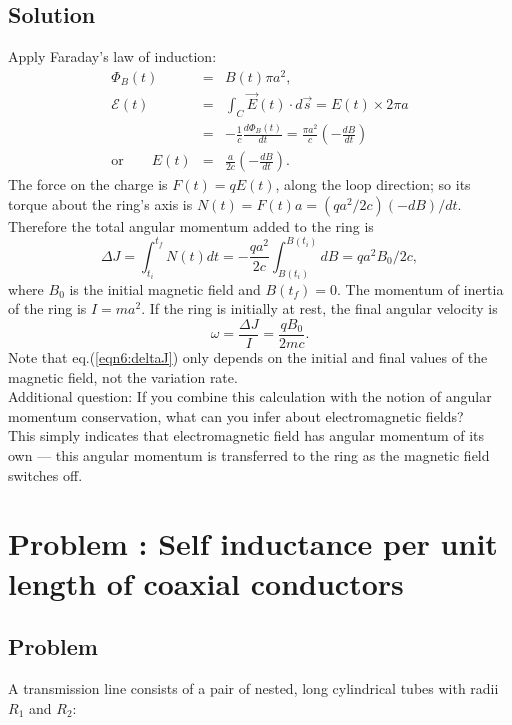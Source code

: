 \documentclass[solutions]{esg8022pset}
\begin{document}
\subsection{Solution}
Apply  Faraday's law of induction:
\begin{eqnarray}
\Phi_B(t)&=&B(t)\pi a^2,\nonumber\\
{\mathcal{E}}(t)&=&\int_C \vec{E}(t)\cdot d\vec{s}=E(t)\times 2\pi a\nonumber\\
&=& -\frac{1}{c}\frac{d\Phi_B(t)}{dt}=\frac{\pi
a^2}{c}\left(-\frac{dB}{dt}\right)\\
\textrm{or}\qquad E(t)&=& \frac{a}{2c}\left(-\frac{dB}{dt}\right).
\end{eqnarray}
The force on the charge is $F(t)=qE(t)$, along the loop
direction; so its torque about the ring's axis is $N(t)=F(t)a=
(qa^2/2c)(-dB)/dt$.  Therefore the total angular momentum added to the ring is
\begin{equation}\label{eqn6:deltaJ}
\Delta J=\int_{t_{i}}^{t_{f}} N(t)dt=-\frac{qa^2}{2c}\int_{B(t_{i})}^{B(t_{i})}dB=qa^2 B_0/2c,
\end{equation}
where $B_0$ is the initial magnetic field and $B(t_{f})=0$.  The
momentum of inertia of the ring is  $I=ma^2$.  If the ring is
initially at rest, the final angular velocity is
\begin{equation}
\omega=\frac{\Delta J}{I}=\frac{qB_0}{2mc}.
\end{equation}
Note that eq.(\ref{eqn6:deltaJ}) only depends on the initial and final
values of the magnetic field, not the variation rate.\\

Additional question: If you combine this calculation with the notion
of angular momentum conservation, what can you infer about
electromagnetic fields?\\

This simply indicates that electromagnetic field has angular momentum
of its own --- this angular momentum is transferred to the ring as the
magnetic field switches off.
\section{Problem \thesection: Self inductance per unit length of coaxial conductors }
\subsection{Problem}
A transmission line consists of a pair of nested, long cylindrical
tubes with radii $R_1$ and $R_2$:
\end{document}
